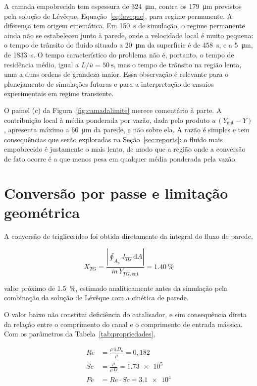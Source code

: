 A camada empobrecida tem espessura de \SI{324}{\micro\meter}, contra os
\SI{179}{\micro\meter} previstos pela solução de Lévêque,
Equação~\eqref{eq:leveque}, para regime permanente. A diferença tem origem
cinemática. Em \SI{150}{\second} de simulação, o regime permanente ainda não se
estabeleceu junto à parede, onde a velocidade local é muito pequena: o tempo de
trânsito do fluido situado a \SI{20}{\micro\meter} da superfície é de
\SI{458}{\second}, e a \SI{5}{\micro\meter}, de \SI{1833}{\second}. O tempo
característico do problema não é, portanto, o tempo de residência médio, igual a
$L/\bar{u} = \SI{50}{\second}$, mas o tempo de trânsito na região lenta, uma a
duas ordens de grandeza maior. Essa observação é relevante para o planejamento
de simulações futuras e para a interpretação de ensaios experimentais em
regime transiente.

O painel (c) da Figura~\ref{fig:camadalimite} merece comentário à parte. A
contribuição local à média ponderada por vazão, dada pelo produto
$u\,(Y_{\text{ent}} - Y)$, apresenta máximo a \SI{66}{\micro\meter} da parede, e
não sobre ela. A razão é simples e tem consequências que serão exploradas na
Seção~\ref{sec:reports}: o fluido mais empobrecido é justamente o mais lento, de
modo que a região onde a conversão de fato ocorre é a que menos pesa em qualquer
média ponderada pela vazão.

\section{Conversão por passe e limitação geométrica}

A conversão de triglicerídeo foi obtida diretamente da integral do fluxo de
parede,

\begin{equation}
X_{TG} = \frac{\left| \oint_{A_p} J_{TG}\, \mathrm{d}A \right|}{\dot{m}\, Y_{TG,\text{ent}}}
= \SI{1.40}{\percent}
\label{eq:conversao}
\end{equation}

\noindent
valor próximo de \SI{1.5}{\percent}, estimado analiticamente antes da simulação
pela combinação da solução de Lévêque com a cinética de parede.

O valor baixo não constitui deficiência do catalisador, e sim consequência
direta da relação entre o comprimento do canal e o comprimento de entrada
mássica. Com os parâmetros da Tabela~\ref{tab:propriedades},

\begin{align}
Re &= \frac{\rho\,\bar{u}\,D_h}{\mu} = 0{,}182 \nonumber\\
Sc &= \frac{\mu}{\rho\,D} = \num{1.73e5} \nonumber\\
Pe &= Re \cdot Sc = \num{3.1e4} \nonumber
\end{align}

